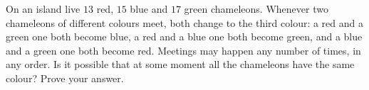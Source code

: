 On an island live $13$ red, $15$ blue and $17$ green chameleons. Whenever two chameleons of different colours meet, both change to the third colour: a red and a green one both become blue, a red and a blue one both become green, and a blue and a green one both become red. Meetings may happen any number of times, in any order. Is it possible that at some moment all the chameleons have the same colour? Prove your answer.
